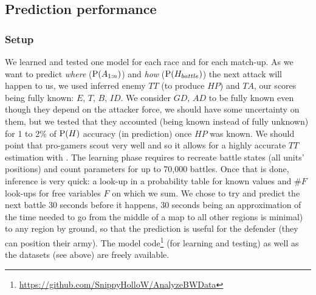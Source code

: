 \subsection{Prediction performance}
\subsubsection{Setup}
We learned and tested one model for each race and for each match-up. As we want to predict \textit{where} ($\mathrm{P}(A_{1:n})$) and \textit{how} ($\mathrm{P}(H_{battle})$) the next attack will happen to us, we used inferred enemy $TT$ (to produce $HP$) and $TA$, our scores being fully known: $E$, $T$, $B$, $ID$. We consider $GD$, $AD$ to be fully known even though they depend on the attacker force, we should have some uncertainty on them, but we tested that they accounted (being known instead of fully unknown) for 1 to 2\% of $\mathrm{P}(H)$ accuracy (in prediction) once $HP$ was known. We should point that pro-gamers scout very well and so it allows for a highly accurate $TT$ estimation with \citep{SYNNAEVE:StratPred}. The learning phase requires to recreate battle states (all units' positions) and count parameters for up to 70,000 battles. Once that is done, inference is very quick: a look-up in a probability table for known values and $\#F$ look-ups for free variables $F$ on which we sum. We chose to try and predict the next battle 30 seconds before it happens, 30 seconds being an approximation of the time needed to go from the middle of a map %
to all other regions is minimal) to any region by ground, so that the prediction is useful for the defender (they can position their army). The model code\footnote{\url{https://github.com/SnippyHolloW/AnalyzeBWData}} (for learning and testing) as well as the datasets (see above) are freely available. 

